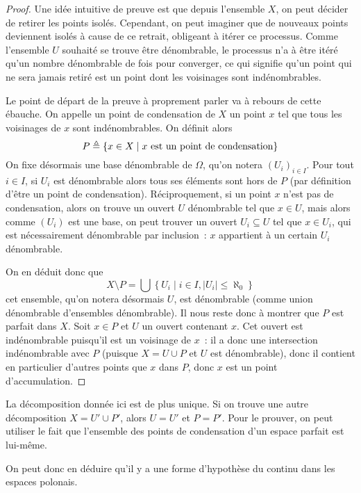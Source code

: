 \begin{proof}
  Une idée intuitive de preuve est que depuis l'ensemble $X$, on peut décider
  de retirer les points isolés. Cependant, on peut imaginer que de nouveaux
  points deviennent isolés à cause de ce retrait, obligeant à itérer ce
  processus. Comme l'ensemble $U$ souhaité se trouve être dénombrable, le
  processus n'a à être itéré qu'un nombre dénombrable de fois pour converger,
  ce qui signifie qu'un point qui ne sera jamais retiré est un point dont les
  voisinages sont indénombrables.

  Le point de départ de la preuve à proprement parler va à rebours de cette
  ébauche. On appelle un point de condensation de $X$ un point $x$ tel que
  tous les voisinages de $x$ sont indénombrables. On définit alors
  \[P \triangleq \{x \in X \mid x\text{ est un point de condensation}\}\]
  On fixe désormais une base dénombrable de $\Omega$, qu'on notera
  $(U_i)_{i\in I}$. Pour tout $i\in I$, si $U_i$ est dénombrable alors tous ses
  éléments sont hors de $P$ (par définition d'être un point de condensation).
  Réciproquement, si un point $x$ n'est pas de condensation, alors on trouve un
  ouvert $U$ dénombrable tel que $x\in U$, mais alors comme $(U_i)$ est une
  base, on peut trouver un ouvert $U_i\subseteq U$ tel que $x\in U_i$, qui est
  nécessairement dénombrable par inclusion~: $x$ appartient à un certain $U_i$
  dénombrable.

  On en déduit donc que
  \[X\setminus P = \bigcup\left\{U_i\mid i \in I, |U_i| \leq \aleph_0\right\}\]
  cet ensemble, qu'on notera désormais $U$, est dénombrable (comme union
  dénombrable d'ensembles dénombrable). Il nous reste donc à montrer que $P$ est
  parfait dans $X$. Soit $x\in P$ et $U$ un ouvert contenant $x$. Cet ouvert
  est indénombrable puisqu'il est un voisinage de $x$~: il a donc une
  intersection indénombrable avec $P$ (puisque $X = U \cup P$ et $U$ est
  dénombrable), donc il contient en particulier d'autres points que $x$ dans
  $P$, donc $x$ est un point d'accumulation.
\end{proof}

\begin{remark}
  La décomposition donnée ici est de plus unique. Si on trouve une autre
  décomposition $X = U' \cup P'$, alors $U = U'$ et $P = P'$. Pour le prouver,
  on peut utiliser le fait que l'ensemble des points de condensation d'un
  espace parfait est lui-même.
\end{remark}

On peut donc en déduire qu'il y a une forme d'hypothèse du continu dans les
espaces polonais.

